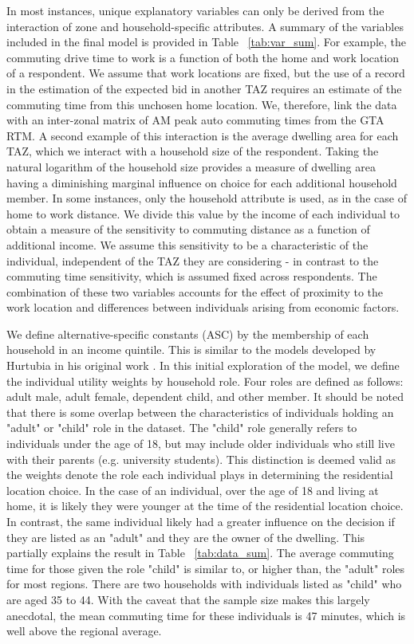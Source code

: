 In most instances, unique explanatory variables can only be derived from the interaction of zone and household-specific attributes. A summary of the variables included in the final model is provided in Table ~\ref{tab:var_sum}. For example, the commuting drive time to work is a function of both the home and work location of a respondent. We assume that work locations are fixed, but the use of a record in the estimation of the expected bid in another TAZ requires an estimate of the commuting time from this unchosen home location. We, therefore, link the data with an inter-zonal matrix of AM peak auto commuting times from the GTA RTM. A second example of this interaction is the average dwelling area for each TAZ, which we interact with a household size of the respondent. Taking the natural logarithm of the household size provides a measure of dwelling area having a diminishing marginal influence on choice for each additional household member. In some instances, only the household attribute is used, as in the case of home to work distance. We divide this value by the income of each individual to obtain a measure of the sensitivity to commuting distance as a function of additional income. We assume this sensitivity to be a characteristic of the individual, independent of the TAZ they are considering - in contrast to the commuting time sensitivity, which is assumed fixed across respondents. The combination of these two variables accounts for the effect of proximity to the work location and differences between individuals arising from economic factors.

We define alternative-specific constants (ASC) by the membership of each household in an income quintile. This is similar to the models developed by Hurtubia in his original work \cite{Hurtubia2012}. In this initial exploration of the model, we define the individual utility weights by household role. Four roles are defined as follows: adult male, adult female, dependent child, and other member. It should be noted that there is some overlap between the characteristics of individuals holding an "adult" or "child" role in the dataset. The "child" role generally refers to individuals under the age of 18, but may include older individuals who still live with their parents (e.g. university students). This distinction is deemed valid as the weights denote the role each individual plays in determining the residential location choice. In the case of an individual, over the age of 18 and living at home, it is likely they were younger at the time of the residential location choice. In contrast, the same individual likely had a greater influence on the decision if they are listed as an "adult" and they are the owner of the dwelling. This partially explains the result in Table ~\ref{tab:data_sum}. The average commuting time for those given the role "child" is similar to, or higher than, the "adult" roles for most regions. There are two households with individuals listed as "child" who are aged 35 to 44. With the caveat that the sample size makes this largely anecdotal, the mean commuting time for these individuals is 47 minutes, which is well above the regional average.

